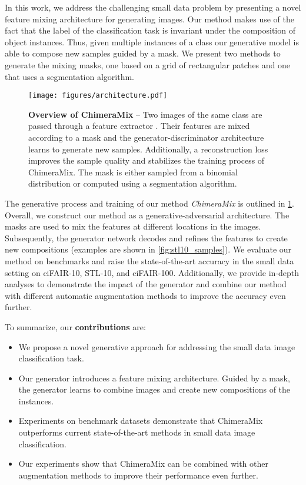 \documentclass{article}
\newcommand{\methodname}{ChimeraMix\xspace}
\newcommand{\cifairX}{ciFAIR-10\xspace}
\newcommand{\cifairC}{ciFAIR-100\xspace}
\newcommand{\stl}{STL-10\xspace}
\begin{document}
In this work, we address the challenging small data problem by presenting a novel feature mixing architecture for generating images. 
Our method makes use of the fact that the label of the classification task is invariant under the composition of object instances.
Thus, given multiple instances of a class our generative model is able to compose new samples guided by a mask. 
We present two methods to generate the mixing masks, one based on a grid of rectangular patches and one that uses a segmentation algorithm.



\begin{figure}[t]
	\centering
	\texttt{[image: figures/architecture.pdf]}	
	\caption{
		\textbf{Overview of \methodname} – Two images of the same class are passed through a feature extractor .
		Their features are mixed according to a mask  and the generator-discriminator architecture learns to generate new samples. 
		Additionally, a reconstruction loss  improves the sample quality and stabilizes the training process of \methodname. 
		The mask is either sampled from a binomial distribution  or computed using a segmentation algorithm.
	}
	\label{fig:architecture}
\end{figure}

The generative process and training of our method \emph{\methodname} is outlined in \cref{fig:architecture}.
Overall, we construct our method as a generative-adversarial architecture.
The masks are used to mix the features at different locations in the images.
Subsequently, the generator network decodes and refines the features to create new compositions (examples are shown in \cref{fig:stl10_samples}).
We evaluate our method on benchmarks and raise the state-of-the-art accuracy in the small data setting on \cifairX, \stl, and \cifairC.
Additionally, we provide in-depth analyses to demonstrate the impact of the generator and combine our method with different automatic augmentation methods to improve the accuracy even further.

To summarize, our \textbf{contributions} are:
\begin{itemize}
    \item We propose a novel generative approach for addressing the small data image classification task.
    \item Our generator introduces a feature mixing architecture. Guided by a mask, the generator learns to combine images and create new compositions of the instances.
    \item Experiments on benchmark datasets demonstrate that \methodname outperforms current state-of-the-art methods in small data image classification.
    \item Our experiments show that \methodname can be combined with other augmentation methods to improve their performance even further.
\end{itemize}
\end{document}
